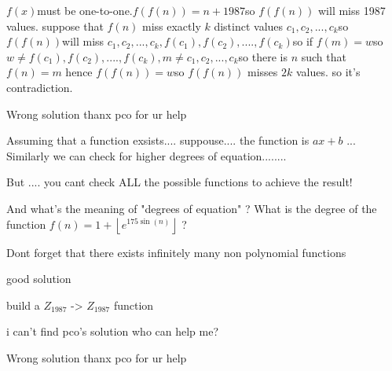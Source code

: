 \begin{solution}
	$f(x)$must be one-to-one.$f(f(n))=n+1987$so $f(f(n))$ will miss 1987 values.
suppose that $f(n)$ miss exactly $k$ distinct values $c_1,c_2,...,c_k$so 
$f(f(n))$will miss $c_1,c_2,...,c_k,f(c_1),f(c_2),....,f(c_k)$so if $f(m)=w$so $w\ne f(c_1),f(c_2),....,f(c_k),m\ne c_1,c_2,...,c_k$so there is $n$ such that $f(n)=m$ hence $f(f(n))=w$so $f(f(n))$ misses $2k$ values.
so it's contradiction.
\end{solution}



\begin{solution}
	Wrong solution thanx pco for ur help
\end{solution}



\begin{solution}
	\begin{tcolorbox}Assuming that a function exsists....   suppouse.... the function is 
$ ax+b $ ...
Similarly we can check for higher degrees of equation........\end{tcolorbox}

But .... you cant check ALL the possible functions to achieve the result!

And what's the meaning of "degrees of equation" ? What is the degree of the function $f(n)=1+\left\lfloor e^{175\sin(n)}\right\rfloor$ ?

Dont forget that there exists infinitely many non polynomial functions
\end{solution}



\begin{solution}
	good solution
\end{solution}



\begin{solution}
	build a $Z_{1987}$ -> $Z_{1987}$ function
\end{solution}



\begin{solution}
	i can't find pco's solution who can help me?\begin{tcolorbox}Wrong solution thanx pco for ur help\end{tcolorbox}


\end{solution}



